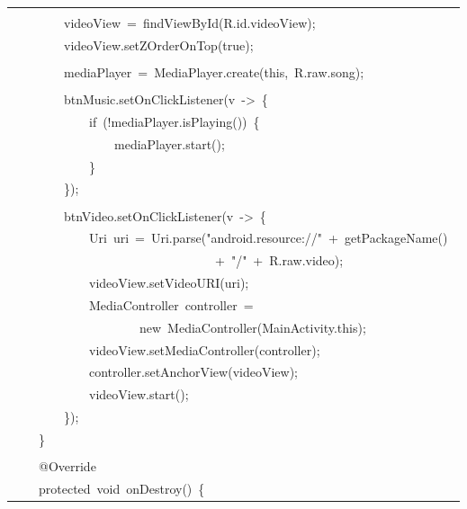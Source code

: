 \documentclass[a4paper,12pt]{article}
\begin{document}
\begin{longtable}{|p{}|}
\strut \\
{\ttfamily\small \ \ \ \ \ \ \ \ videoView\ =\ findViewById(R.id.videoView);} \\
{\ttfamily\small \ \ \ \ \ \ \ \ videoView.setZOrderOnTop(true);} \\
\strut \\
{\ttfamily\small \ \ \ \ \ \ \ \ mediaPlayer\ =\ MediaPlayer.create(this,\ R.raw.song);} \\
\strut \\
{\ttfamily\small \ \ \ \ \ \ \ \ btnMusic.setOnClickListener(v\ -\textgreater{}\ \{} \\
{\ttfamily\small \ \ \ \ \ \ \ \ \ \ \ \ if\ (!mediaPlayer.isPlaying())\ \{} \\
{\ttfamily\small \ \ \ \ \ \ \ \ \ \ \ \ \ \ \ \ mediaPlayer.start();} \\
{\ttfamily\small \ \ \ \ \ \ \ \ \ \ \ \ \}} \\
{\ttfamily\small \ \ \ \ \ \ \ \ \});} \\
\strut \\
{\ttfamily\small \ \ \ \ \ \ \ \ btnVideo.setOnClickListener(v\ -\textgreater{}\ \{} \\
{\ttfamily\small \ \ \ \ \ \ \ \ \ \ \ \ Uri\ uri\ =\ Uri.parse("android.resource://"\ +\ getPackageName()\ } \\
{\ttfamily\small \ \ \ \ \ \ \ \ \ \ \ \ \ \ \ \ \ \ \ \ \ \ \ \ \ \ \ \ \ \ \ \ +\ "/"\ +\ R.raw.video);} \\
{\ttfamily\small \ \ \ \ \ \ \ \ \ \ \ \ videoView.setVideoURI(uri);} \\
{\ttfamily\small \ \ \ \ \ \ \ \ \ \ \ \ MediaController\ controller\ =\ } \\
{\ttfamily\small \ \ \ \ \ \ \ \ \ \ \ \ \ \ \ \ \ \ \ \ new\ MediaController(MainActivity.this);} \\
{\ttfamily\small \ \ \ \ \ \ \ \ \ \ \ \ videoView.setMediaController(controller);} \\
{\ttfamily\small \ \ \ \ \ \ \ \ \ \ \ \ controller.setAnchorView(videoView);} \\
{\ttfamily\small \ \ \ \ \ \ \ \ \ \ \ \ videoView.start();} \\
{\ttfamily\small \ \ \ \ \ \ \ \ \});} \\
{\ttfamily\small \ \ \ \ \}} \\
\strut \\
{\ttfamily\small \ \ \ \ @Override} \\
{\ttfamily\small \ \ \ \ protected\ void\ onDestroy()\ \{} \\

\end{longtable}
\end{document}
